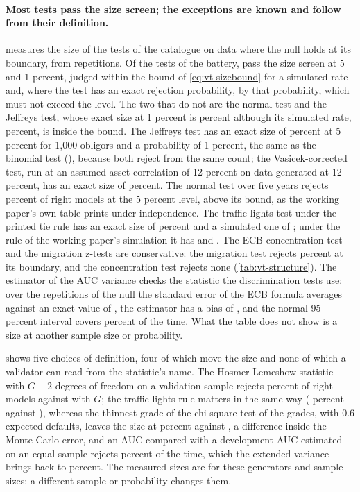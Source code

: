 \paragraph{Most tests pass the size screen; the exceptions are known and follow from their definition.}  measures the size of the tests of the catalogue on data where the null holds at its boundary, from \vtNullReps{} repetitions. Of the \vtHoldSizeOf{} tests of the battery, \vtHoldSize{} pass the size screen at 5 and 1 percent, judged within the bound of \cref{eq:vt-sizebound} for a simulated rate and, where the test has an exact rejection probability, by that probability, which must not exceed the level. The two that do not are the normal test and the Jeffreys test, whose exact size at 1 percent is \vtJeffreysExactOne{} percent although its simulated rate, \vtJeffreysSimOne{} percent, is inside the bound. The Jeffreys test has an exact size of \vtJeffreysExact{}
percent at 5 percent for 1,000 obligors and a probability of 1 percent, the same as the binomial test (\vtBinomExact{}), because both reject from the same count; the Vasicek-corrected test, run at an assumed asset correlation of 12 percent on data generated at 12 percent, has an exact size of \vtVasicekExact{} percent. The normal test over five years rejects \vtNormalSize{} percent of right models at the 5 percent level, above its bound, as the working paper's own table prints under independence.
The traffic-lights test under the printed tie rule has an exact size of \vtTlLowerExact{} percent and a simulated one of \vtTlLowerSize{}; under the rule of the working paper's simulation it has \vtTlUpperExact{} and \vtTlUpperSize{}. The ECB concentration test and the migration z-tests are conservative: the migration test rejects \vtMigSize{} percent at its boundary, and the concentration test rejects none
(\cref{tab:vt-structure}). The estimator of the AUC variance checks the statistic the discrimination tests use: over the repetitions of the null the standard error of the ECB formula averages \vtAucModelSe{} against an exact value of \vtAucExactSe{}, the estimator has a bias of \vtAucBias{}, and the normal 95 percent interval covers \vtAucCover{} percent of the time. What the table does not show is a size at another sample size or probability.



 shows five choices of definition, four of which move the size and none of which a validator can read from the statistic's name. The Hosmer-Lemeshow statistic with $G-2$ degrees of freedom on a validation sample rejects \vtHlFittedSize{} percent of right models against \vtHlSize{} with $G$; the traffic-lights rule matters in the same way (\vtTlLowerSize{} percent against \vtTlUpperSize{}), whereas the thinnest grade of the chi-square test of the grades, with 0.6 expected defaults, leaves the size at \vtChiThin{} percent against \vtChiNull{}, a difference inside the Monte Carlo error, and
an AUC compared with a development AUC estimated on an equal sample rejects \vtAucInitDevOne{} percent of the time, which the extended variance brings back to \vtAucInitExt{} percent. The measured sizes are for these generators and sample sizes; a different sample or probability changes them.

